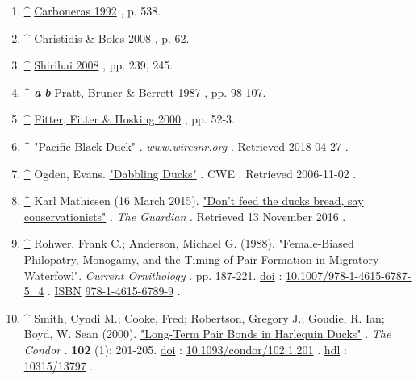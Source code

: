 \documentclass[11pt,a4paper]{article}
\begin{document}
\begin{enumerate}
\item \href{\#cite\_ref-FOOTNOTECarboneras1992538\_18-0}{\textbf{\textasciicircum{}}} \href{\#CITEREFCarboneras1992}{Carboneras 1992} , p. 538.
\item \href{\#cite\_ref-FOOTNOTEChristidisBoles200862\_19-0}{\textbf{\textasciicircum{}}} \href{\#CITEREFChristidisBoles2008}{Christidis \& Boles 2008} , p. 62.
\item \href{\#cite\_ref-FOOTNOTEShirihai2008239,\_245\_20-0}{\textbf{\textasciicircum{}}} \href{\#CITEREFShirihai2008}{Shirihai 2008} , pp. 239, 245.
\item \textasciicircum{} \href{\#cite\_ref-FOOTNOTEPrattBrunerBerrett198798–107\_21-0}{\textit{\textbf{a}}} \href{\#cite\_ref-FOOTNOTEPrattBrunerBerrett198798–107\_21-1}{\textit{\textbf{b}}} \href{\#CITEREFPrattBrunerBerrett1987}{Pratt, Bruner \& Berrett 1987} , pp. 98-107.
\item \href{\#cite\_ref-FOOTNOTEFitterFitterHosking200052–3\_22-0}{\textbf{\textasciicircum{}}} \href{\#CITEREFFitterFitterHosking2000}{Fitter, Fitter \& Hosking 2000} , pp. 52-3.
\item \href{\#cite\_ref-23}{\textbf{\textasciicircum{}}} \href{http://www.wiresnr.org/pacificblackduck.html}{"Pacific Black Duck"} . \textit{www.wiresnr.org} . Retrieved 2018-04-27 .
\item \href{\#cite\_ref-24}{\textbf{\textasciicircum{}}} Ogden, Evans. \href{https://www.sfu.ca/biology/wildberg/species/dabbducks.html}{"Dabbling Ducks"} . CWE . Retrieved 2006-11-02 .
\item \href{\#cite\_ref-25}{\textbf{\textasciicircum{}}} Karl Mathiesen (16 March 2015). \href{https://www.theguardian.com/environment/2015/mar/16/dont-feed-the-ducks-bread-say-conservationists}{"Don't feed the ducks bread, say conservationists"} . \textit{The Guardian} . Retrieved 13 November 2016 .
\item \href{\#cite\_ref-26}{\textbf{\textasciicircum{}}} Rohwer, Frank C.; Anderson, Michael G. (1988). "Female-Biased Philopatry, Monogamy, and the Timing of Pair Formation in Migratory Waterfowl". \textit{Current Ornithology} . pp. 187-221. \href{/wiki/Doi\_\%28identifier\%29}{doi} : \href{https://doi.org/10.1007\%2F978-1-4615-6787-5\_4}{10.1007/978-1-4615-6787-5\_4} . \href{/wiki/ISBN\_\%28identifier\%29}{ISBN} \href{/wiki/Special:BookSources/978-1-4615-6789-9}{978-1-4615-6789-9} .
\item \href{\#cite\_ref-27}{\textbf{\textasciicircum{}}} Smith, Cyndi M.; Cooke, Fred; Robertson, Gregory J.; Goudie, R. Ian; Boyd, W. Sean (2000). \href{https://doi.org/10.1093\%2Fcondor\%2F102.1.201}{"Long-Term Pair Bonds in Harlequin Ducks"} . \textit{The Condor} . \textbf{102} (1): 201-205. \href{/wiki/Doi\_\%28identifier\%29}{doi} : \href{https://doi.org/10.1093\%2Fcondor\%2F102.1.201}{10.1093/condor/102.1.201} . \href{/wiki/Hdl\_\%28identifier\%29}{hdl} : \href{https://hdl.handle.net/10315\%2F13797}{10315/13797} .

\end{enumerate}
\end{document}
